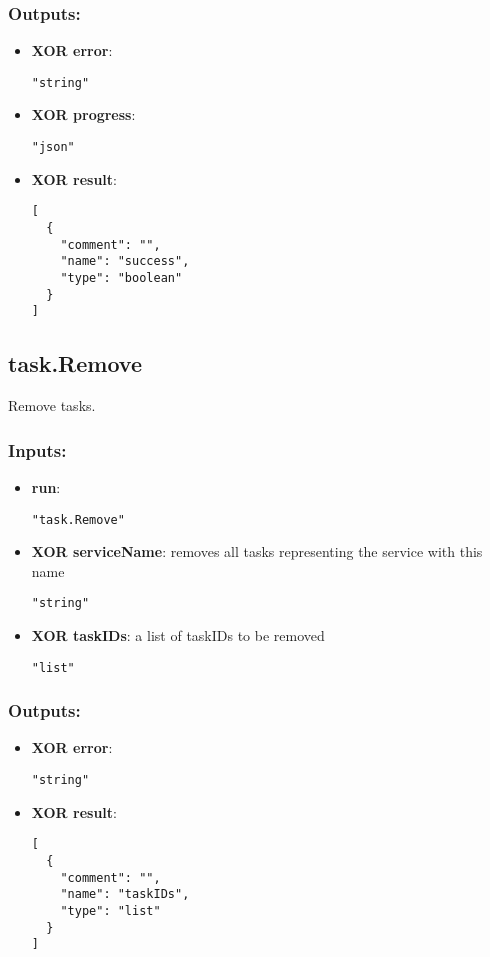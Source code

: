 \subsubsection*{Outputs:}
\begin{itemize}
    \item \textbf{XOR error}: 
\begin{lstlisting}
"string"
\end{lstlisting}
    \item \textbf{XOR progress}: 
\begin{lstlisting}
"json"
\end{lstlisting}
    \item \textbf{XOR result}: 
\begin{lstlisting}
[
  {
    "comment": "", 
    "name": "success", 
    "type": "boolean"
  }
]
\end{lstlisting}
  \end{itemize}

\subsection{task.Remove}
Remove tasks.
\subsubsection*{Inputs:}
\begin{itemize}
    \item \textbf{run}: 
\begin{lstlisting}
"task.Remove"
\end{lstlisting}
    \item \textbf{XOR serviceName}: removes all tasks representing the service with this name
\begin{lstlisting}
"string"
\end{lstlisting}
    \item \textbf{XOR taskIDs}: a list of taskIDs to be removed
\begin{lstlisting}
"list"
\end{lstlisting}
  \end{itemize}

\subsubsection*{Outputs:}
\begin{itemize}
    \item \textbf{XOR error}: 
\begin{lstlisting}
"string"
\end{lstlisting}
    \item \textbf{XOR result}: 
\begin{lstlisting}
[
  {
    "comment": "", 
    "name": "taskIDs", 
    "type": "list"
  }
]
\end{lstlisting}
  \end{itemize}

